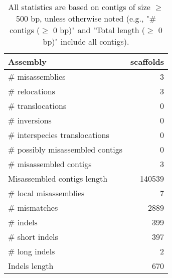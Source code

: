 \documentclass[12pt,a4paper]{article}
\begin{document}
\begin{table}[ht]
\begin{center}
\caption{All statistics are based on contigs of size $\geq$ 500 bp, unless otherwise noted (e.g., "\# contigs ($\geq$ 0 bp)" and "Total length ($\geq$ 0 bp)" include all contigs).}
\begin{tabular}{|l*{1}{|r}|}
\hline
Assembly & scaffolds \\ \hline
\# misassemblies & 3 \\ \hline
\hspace{5mm}\# relocations & 3 \\ \hline
\hspace{5mm}\# translocations & 0 \\ \hline
\hspace{5mm}\# inversions & 0 \\ \hline
\hspace{5mm}\# interspecies translocations & 0 \\ \hline
\# possibly misassembled contigs & 0 \\ \hline
\# misassembled contigs & 3 \\ \hline
Misassembled contigs length & 140539 \\ \hline
\# local misassemblies & 7 \\ \hline
\# mismatches & 2889 \\ \hline
\# indels & 399 \\ \hline
\hspace{5mm}\# short indels & 397 \\ \hline
\hspace{5mm}\# long indels & 2 \\ \hline
Indels length & 670 \\ \hline
\end{tabular}
\end{center}
\end{table}
\end{document}
